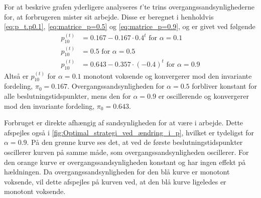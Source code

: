 For at beskrive grafen yderligere analyseres $t$'te trins overgangssandsynlighederne for, at forbrugeren mister sit arbejde. Disse er beregnet i henholdvis \eqref{eq:p_t.p0.1}, \eqref{eq:matrice_p=0.5} og \eqref{eq:matrice_p=0.9}, og er givet ved følgende
\begin{align*}
    p_{10}^{(t)}&=0.167-0.167\cdot 0.4^t \text{ for } \alpha=0.1\\
    p_{10}^{(t)} &= 0.5 \text{ for } \alpha = 0.5\\
    p_{10}^{(t)} &= 0.643 - 0.357 \cdot (-0.4)^t \text{ for } \alpha=0.9
\end{align*}
Altså er $p_{10}^{(t)}$ for $\alpha=0.1$ monotont voksende og konvergerer mod den invariante fordeling, $\pi_0 = 0.167$. Overgangssandsynligheden for $\alpha=0.5$ forbliver konstant for alle beslutningstidspunkter, mens den for $\alpha=0.9$ er oscillerende og konvergerer mod den invariante fordeling, $\pi_0=0.643$. 

Forbruget er direkte afhængig af sandsynligheden for at være i arbejde. Dette afspejles også i \autoref{fig:Optimal_strategi_ved_ændring_i_p}, hvilket er tydeligst for $\alpha=0.9$. På den grønne kurve ses det, at ved de første beslutningstidspunkter oscillerer kurven på samme måde, som overgangssandsynligheden oscillerer. For den orange kurve er overgangssandsynligheden konstant og har ingen effekt på hældningen. Da overgangssandsynligheden for den blå kurve er monotont voksende, vil dette afspejles på kurven ved, at den blå kurve ligeledes er monotont voksende. 


















